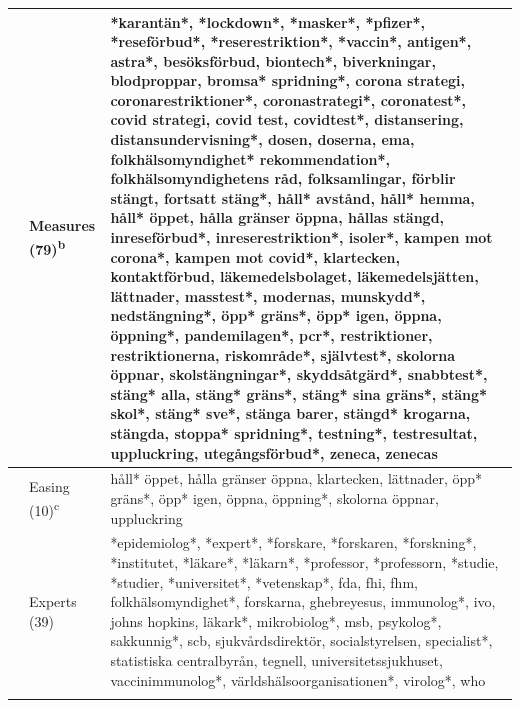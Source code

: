 \documentclass[
]{ccr}
\begin{document}
{\begin{spacing}{.9}
\begin{longtable}[]{@{}
  >{\raggedright\arraybackslash}p{.09\linewidth}
  >{\raggedright\arraybackslash}p{.12\linewidth}
  >{\raggedright\arraybackslash}p{.71\linewidth}@{}}
& Measures (79)\textsuperscript{b} & *karantän*, *lockdown*, *masker*,
*pfizer*, *reseförbud*, *reserestriktion*, *vaccin*, antigen*, astra*,
besöksförbud, biontech*, biverkningar, blodproppar, bromsa* spridning*,
corona strategi, coronarestriktioner*, coronastrategi*, coronatest*,
covid strategi, covid test, covidtest*, distansering,
distansundervisning*, dosen, doserna, ema, folkhälsomyndighet*
rekommendation*, folkhälsomyndighetens råd, folksamlingar, förblir
stängt, fortsatt stäng*, håll* avstånd, håll* hemma, håll* öppet, hålla
gränser öppna, hållas stängd, inreseförbud*, inreserestriktion*,
isoler*, kampen mot corona*, kampen mot covid*, klartecken,
kontaktförbud, läkemedelsbolaget, läkemedelsjätten, lättnader,
masstest*, modernas, munskydd*, nedstängning*, öpp* gräns*, öpp* igen,
öppna, öppning*, pandemilagen*, pcr*, restriktioner, restriktionerna,
riskområde*, självtest*, skolorna öppnar, skolstängningar*,
skyddsåtgärd*, snabbtest*, stäng* alla, stäng* gräns*, stäng* sina
gräns*, stäng* skol*, stäng* sve*, stänga barer, stängd* krogarna,
stängda, stoppa* spridning*, testning*, testresultat, uppluckring,
utegångsförbud*, zeneca, zenecas \\ \cline{2-3}

& Easing (10)\textsuperscript{c} & håll* öppet, hålla gränser öppna,
klartecken, lättnader, öpp* gräns*, öpp* igen, öppna, öppning*, skolorna
öppnar, uppluckring \\ \cline{2-3}

& Experts (39) & *epidemiolog*, *expert*, *forskare, *forskaren,
*forskning*, *institutet, *läkare*, *läkarn*, *professor, *professorn,
*studie, *studier, *universitet*, *vetenskap*, fda, fhi, fhm,
folkhälsomyndighet*, forskarna, ghebreyesus, immunolog*, ivo, johns
hopkins, läkark*, mikrobiolog*, msb, psykolog*, sakkunnig*, scb,
sjukvårdsdirektör, socialstyrelsen, specialist*, statistiska
centralbyrån, tegnell, universitetssjukhuset, vaccinimmunolog*,
världshälsoorganisationen*, virolog*, who \\ \cline{2-3}


\end{longtable}
\end{spacing}}
\end{document}
